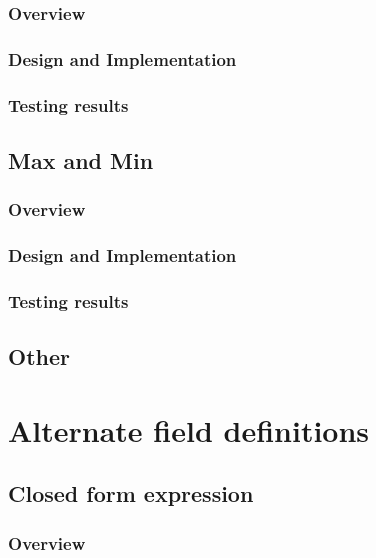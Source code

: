 \documentclass{article}
\begin{document}
\subsubsection{Overview}

\subsubsection{Design and Implementation}

\subsubsection{Testing results}



\subsection{{\color{blue} Max and Min}} 
\subsubsection{Overview}

\subsubsection{Design and Implementation}

\subsubsection{Testing results}



\subsection{{\color{blue} Other}}


%
%
%

\section{Alternate field definitions}
\subsection{{\color{blue}Closed form expression}}
\subsubsection{Overview}





 
\end{document}
